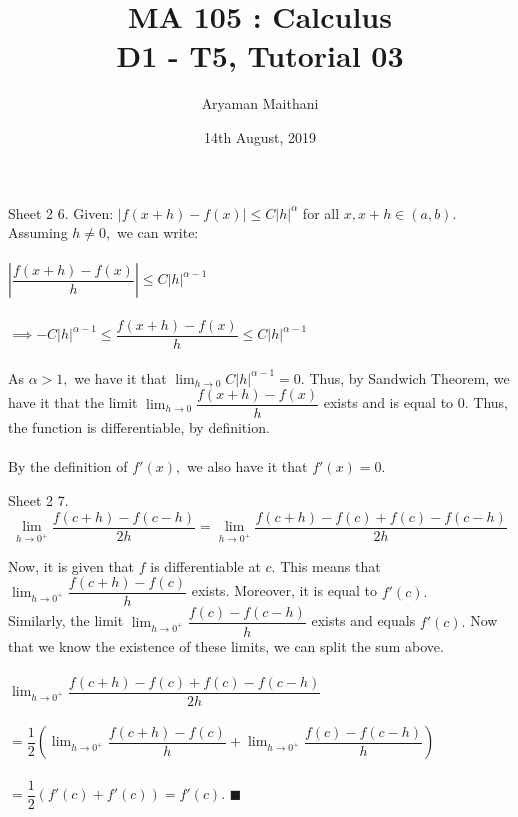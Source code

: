 \documentclass[handout, aspectratio=169]{beamer}
\title{MA 105 : Calculus\\ D1 - T5, Tutorial 03}  %
\author{Aryaman Maithani}
\date[14-08-2019]{14th August, 2019}               %
\institute[IITB]{IIT Bombay}
\begin{document}
\begin{frame}
	\titlepage
\end{frame}
\begin{frame}{Sheet 2}                            %
	6. Given: $|f(x+h) - f(x)| \le C|h|^\alpha$ for all $x, x + h \in (a, b).$\\
	Assuming $h \neq 0,$ we can write:\\~\\
	$\left|\dfrac{f(x + h) - f(x)}{h}\right| \le C|h|^{\alpha-1}$\\~\\
	$\implies -C|h|^{\alpha-1} \le \dfrac{f(x + h) - f(x)}{h} \le C|h|^{\alpha-1}$\\~\\
	As $\alpha > 1,$ we have it that $\displaystyle\lim_{h\to 0}C|h|^{\alpha-1} = 0.$ Thus, by Sandwich Theorem, we have it that the limit $\displaystyle\lim_{h\to 0}\dfrac{f(x + h) - f(x)}{h}$ exists and is equal to 0. Thus, the function is differentiable, by definition.\\~\\
	By the definition of $f'(x),$ we also have it that $f'(x) = 0.$
\end{frame}
\begin{frame}{Sheet 2}
7. \[\lim_{h\to 0^+}\dfrac{f(c + h) - f(c - h)}{2h}%
		= \lim_{h\to 0^+}\dfrac{f(c + h) - f(c) + f(c) - f(c - h)}{2h}\]

Now, it is given that $f$ is differentiable at $c.$ This means that $\displaystyle\lim_{h\to 0^+}\dfrac{f(c + h) - f(c)}{h}$ exists. Moreover, it is equal to $f'(c).$\\
Similarly, the limit $\displaystyle\lim_{h\to 0^+}\dfrac{f(c) - f(c-h)}{h}$ exists and equals $f'(c).$ Now that we know the existence of these limits, we can split the sum above.\\~\\
$\displaystyle\lim_{h\to 0^+}\dfrac{f(c + h) - f(c) + f(c) - f(c - h)}{2h}$\\~\\
$=\displaystyle\dfrac{1}{2}\left(\lim_{h\to 0^+}\dfrac{f(c + h) - f(c)}{h} + \lim_{h\to 0^+}\dfrac{f(c) - f(c - h)}{h}\right)$\\~\\
$=\dfrac{1}{2}\left(f'(c) + f'(c)\right) = f'(c).$ \hfill $\blacksquare$
\end{frame}
\end{document}
